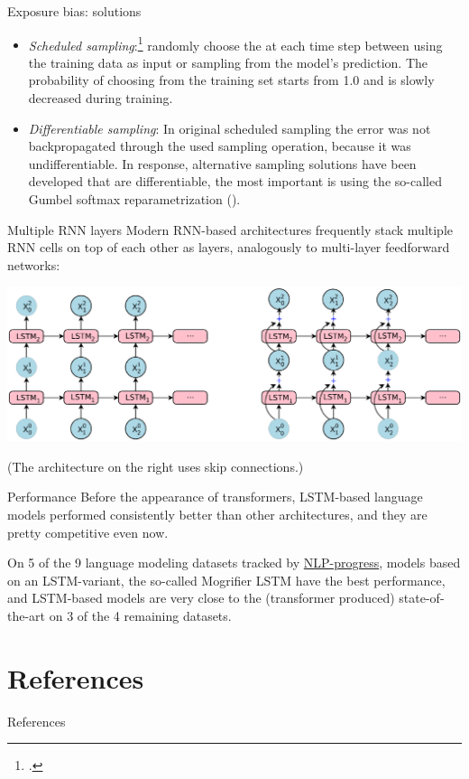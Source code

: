 \documentclass[style=upen, size=14pt]{powerdot}
\newcommand{\gold}{\color{arany}}
\theoremstyle{definition}
\begin{document}
\begin{slide}[toc=]{Exposure bias: solutions}
  \begin{itemize}
  \item \emph{\gold Scheduled sampling}:\footnote{\cite{bengio2015scheduled}.}
    randomly choose the at each time step between using the training data as
    input or sampling from the model's prediction. The probability of choosing
    from the training set starts from 1.0 and is slowly decreased during
    training.
  \item \emph{\gold Differentiable sampling}: In original scheduled sampling the
    error was not backpropagated through the used sampling operation, because it
    was undifferentiable. In response, alternative sampling solutions have been
    developed that are differentiable, the most important is using the so-called
    Gumbel softmax reparametrization (\cite{jang2016categorical}).
  \end{itemize}
\end{slide}

\begin{slide}{Multiple RNN layers}
  Modern RNN-based architectures frequently stack multiple RNN cells on top of
  each other as layers, analogously to multi-layer feedforward networks:
  \begin{center}
    \includegraphics[width=1.\textwidth]{figures/lstm_layers.eps}
  \end{center}
  (The architecture on the right uses skip connections.)
\end{slide}

\begin{slide}{Performance}
  Before the appearance of transformers, LSTM-based language models performed
  consistently better than other architectures, and they are pretty competitive
  even now.\bigskip

  On 5 of the 9 language modeling datasets tracked by
  \href{http://http://nlpprogress.com}{NLP-progress}, models based on an
  LSTM-variant, the so-called Mogrifier LSTM have the best performance, and
  LSTM-based models are very close to the (transformer produced)
  state-of-the-art on 3 of the 4 remaining datasets.
\end{slide}

\section{References}

\begin{slide}{References}
  
  \begin{footnotesize}
        
  \end{footnotesize}
\end{slide}
\end{document}
